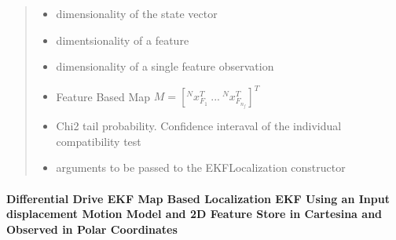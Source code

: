\documentclass[letterpaper,10pt,english]{sphinxmanual}
\begin{document}
\begin{fulllineitems}
\begin{fulllineitems}
\begin{quote}
\begin{description}
\begin{itemize}
\item {} 
\sphinxAtStartPar
{} \textendash{} dimensionality of the state vector

\item {} 
\sphinxAtStartPar
{} \textendash{} dimentsionality of a feature

\item {} 
\sphinxAtStartPar
{} \textendash{} dimensionality of a single feature observation

\item {} 
\sphinxAtStartPar
{} \textendash{} Feature Based Map \(M =[^Nx_{F_1}^T~...~^Nx_{F_{n_f}}^T]^T\)

\item {} 
\sphinxAtStartPar
{} \textendash{} Chi2 tail probability. Confidence interaval of the individual compatibility test

\item {} 
\sphinxAtStartPar
{} \textendash{} arguments to be passed to the EKFLocalization constructor

\end{itemize}

\end{description}\end{quote}

\end{fulllineitems}


\end{fulllineitems}



\paragraph{Differential Drive EKF Map Based Localization EKF Using an Input displacement Motion Model and 2D Feature Store in Cartesina and Observed in Polar Coordinates}
\label{\detokenize{FEKFMBLocalization:differential-drive-ekf-map-based-localization-ekf-using-an-input-displacement-motion-model-and-2d-feature-store-in-cartesina-and-observed-in-polar-coordinates}}
\begin{figure}[htbp]
\centering

\noindent{}
\end{figure}
\end{document}
